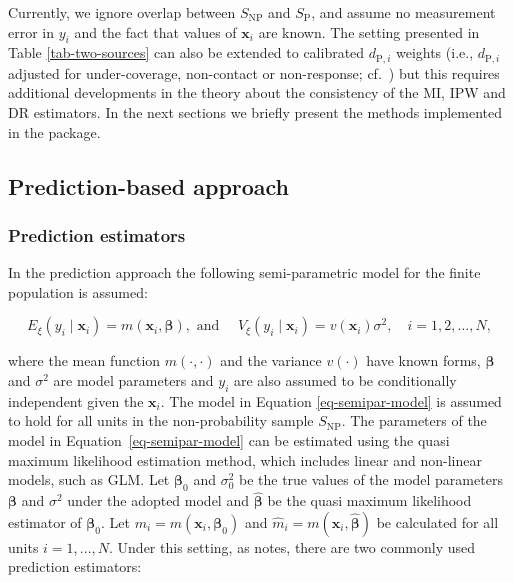 \documentclass[
]{jss}
\begin{document}
Currently, we ignore overlap between \(S_{\text{NP}}\) and
\(S_{\text{P}}\), and assume no measurement error in \(y_i\) and the
fact that values of \(\boldsymbol{x}_i\) are known. The setting
presented in Table \ref{tab-two-sources} can also be extended to
calibrated \(d_{\text{P},i}\) weights (i.e., \(d_{\text{P},i}\) adjusted
for under-coverage, non-contact or non-response;
cf.~\cite{sarndal2005estimation}) but this requires additional
developments in the theory about the consistency of the MI, IPW and DR
estimators. In the next sections we briefly present the methods
implemented in the package.

\subsection{Prediction-based approach}\label{sec-prediction}

\subsubsection{Prediction estimators}\label{prediction-estimators}

In the prediction approach the following semi-parametric model for the
finite population is assumed:

\begin{equation}
E_{\xi}\left(y_i \mid \boldsymbol{x}_i\right)=m\left(\boldsymbol{x}_i, \boldsymbol{\beta}\right), \text { and } \quad V_{\xi}\left(y_i \mid \boldsymbol{x}_i\right)=v\left(\boldsymbol{x}_i\right) \sigma^2, \quad i=1,2, \ldots, N,
\label{eq-semipar-model}
\end{equation}

where the mean function \(m(\cdot,\cdot)\) and the variance \(v(\cdot)\)
have known forms, \(\boldsymbol{\beta}\) and \(\sigma^2\) are model
parameters and \(y_i\) are also assumed to be conditionally independent
given the \(\boldsymbol{x}_i\). The model in Equation
\ref{eq-semipar-model} is assumed to hold for all units in the
non-probability sample \(S_{\text{NP}}\). The parameters of the model in
Equation~\ref{eq-semipar-model} can be estimated using the quasi maximum
likelihood estimation method, which includes linear and non-linear
models, such as GLM. Let \(\boldsymbol{\beta}_0\) and \(\sigma^2_0\) be
the true values of the model parameters \(\boldsymbol{\beta}\) and
\(\sigma^2\) under the adopted model and \(\hat{\boldsymbol{\beta}}\) be
the quasi maximum likelihood estimator of \(\boldsymbol{\beta}_0\). Let
\(m_i=m(\boldsymbol{x}_i, \boldsymbol{\beta}_0)\) and
\(\hat{m}_i=m(\boldsymbol{x}_i, \hat{\boldsymbol{\beta}})\) be
calculated for all units \(i=1,...,N\). Under this setting, as
\citet{wu2022statistical} notes, there are two commonly used prediction
estimators:
\end{document}
